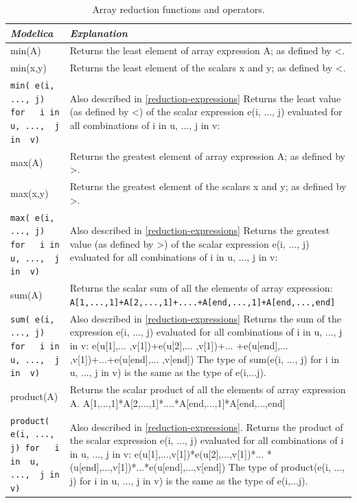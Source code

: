 \documentclass[10pt,a4paper]{report}
\begin{document}
\begin{longtable}{|p{3cm}|p{9cm}|}
\caption{Array reduction functions and operators.}\\
\hline
\emph{Modelica} & \emph{Explanation}\\ \hline
\endhead
min(A)
&
Returns the least element of array expression A; as defined by
\textless{}.\\ \hline
min(x,y)
&
Returns the least element of the scalars x and y; as defined by
\textless{}.\\ \hline
\lstinline!min( e(i, ..., j) for   i in  u, ...,  j in  v)!
&
Also described in \ref{reduction-expressions}\newline
Returns the least value (as defined by \textless{}) of the scalar
expression e(i, ..., j) evaluated for all combinations of i in u, ..., j
in v:\\ \hline
max(A)
&
Returns the greatest element of array expression A; as defined by
\textgreater{}.\\ \hline
max(x,y)
&
Returns the greatest element of the scalars x and y; as defined by
\textgreater{}.\\ \hline
\lstinline!max( e(i, ..., j) for   i in  u, ...,  j in  v)!
&
Also described in \ref{reduction-expressions}\newline
Returns the greatest value (as defined by \textgreater{}) of the scalar
expression e(i, ..., j) evaluated for all combinations of i in u, ..., j
in v:\\ \hline
sum(A)
&
Returns the scalar sum of all the elements of array expression:\newline
\lstinline!A[1,...,1]+A[2,...,1]+....+A[end,...,1]+A[end,...,end]!
\\ \hline
\lstinline!sum( e(i, ..., j) for   i in  u, ...,  j in  v)!
&
Also described in \ref{reduction-expressions}\newline
Returns the sum of the expression e(i, ..., j) evaluated for all
combinations of i in u, ..., j in v: e(u{[}1{]},...
  ,v{[}1{]})+e(u{[}2{]},... ,v{[}1{]})+... +e(u{[}end{]},...
  ,v{[}1{]})+...+e(u{[}end{]},... ,v{[}end{]})
  The type of sum(e(i, ..., j) for  i in u, ..., j
    in v) is the same as the type of e(i,...j).
\\ \hline
product(A)
&
Returns the scalar product of all the elements of array expression A.\newline
  A[1,...,1]*A[2,...,1]*....*A[end,...,1]*A[end,...,end]
\\ \hline
\lstinline!product( e(i, ..., j) for   i in  u, ...,  j in  v)!
&
Also described in \ref{reduction-expressions}.\newline
Returns the product of the scalar expression e(i, ..., j) evaluated for
all combinations of i in u, ..., j in v:
  e(u[1],...,v[1])*e(u[2],...,v[1])*...
  *(u[end],...,v[1])*...*e(u[end],...,v[end])
  The type of product(e(i, ..., j) for  i in u, ..., j
    in v) is the same as the type of e(i,...j).
\\ \hline

\end{longtable}
\end{document}
